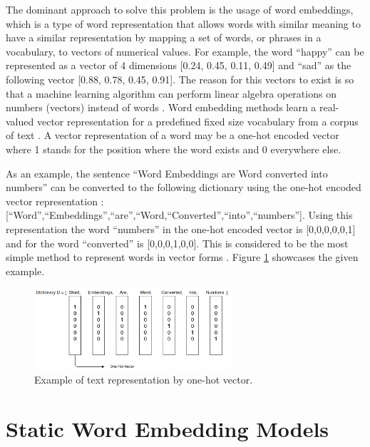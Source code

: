     \par The dominant approach to solve this problem is the usage of word embeddings, which is a type of word representation that allows words with similar meaning to have a similar representation by mapping a set of words, or phrases in a vocabulary, to vectors of numerical values. For example, the word “happy” can be represented as a vector of 4 dimensions [0.24, 0.45, 0.11, 0.49] and “sad” as the following vector [0.88, 0.78, 0.45, 0.91]. The reason for this vectors to exist is so that a machine learning algorithm can perform linear algebra operations on numbers (vectors) instead of words \cite{MuratMustafa}. Word embedding methods learn a real-valued vector representation for a predefined fixed size vocabulary from a corpus  of text \cite{Brownlee2017}. A vector representation of a word may be a one-hot encoded vector where 1 stands for the position where the word exists and 0 everywhere else. 
    
    \par As an example, the sentence ``Word Embeddings are Word converted into numbers” can be converted to the following dictionary using the one-hot encoded vector representation : [``Word”,``Embeddings”,``are”,``Word,``Converted”,``into”,``numbers”]. Using this representation the word ``numbers” in the one-hot encoded vector is [0,0,0,0,0,1] and for the word ``converted” is [0,0,0,1,0,0]. This is considered to be the most simple method to represent words in vector forms \cite{Vidhya2017}. Figure \ref{fig:onehott} showcases the given example.
    
    
    \begin{figure}[H]
        \centering
        \captionsetup{justification=centering}
        \includegraphics[width=0.65\textwidth]{Sections/3StateOfTheArt/3_images/one_hot_encoding.png}
        \caption{Example of text representation by one-hot vector.}   
        \label{fig:onehott}
    \end{figure}
    
    
    



    \section{Static Word Embedding Models}
    \label{sec:static}

